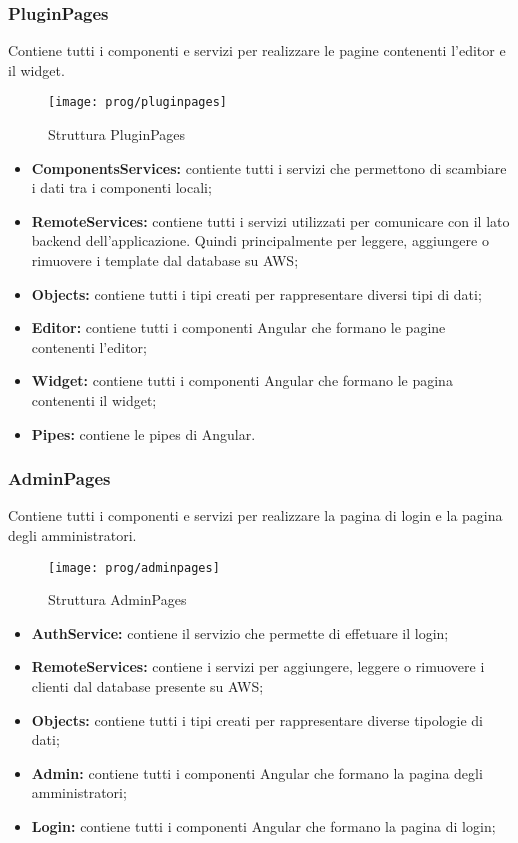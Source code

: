 \subsubsection{PluginPages}
Contiene tutti i componenti e servizi per realizzare le pagine contenenti l'editor e il widget.
\begin{figure}[!h] 
	\centering 
	\texttt{[image: prog/pluginpages]} 
	\caption{Struttura PluginPages}
\end{figure}
\begin{itemize}
	\item \textbf{ComponentsServices:} contiente tutti i servizi che permettono di scambiare i dati tra i componenti locali;
	\item \textbf{RemoteServices:} contiene tutti i servizi utilizzati per comunicare con il lato backend dell'applicazione. Quindi principalmente per leggere, aggiungere o rimuovere i template dal database su AWS;
	\item \textbf{Objects:} contiene tutti i tipi creati per rappresentare diversi tipi di dati;
	\item \textbf{Editor:} contiene tutti i componenti Angular che formano le pagine contenenti l'editor;
	\item \textbf{Widget:} contiene tutti i componenti Angular che formano le pagina contenenti il widget;
	\item \textbf{Pipes:} contiene le pipes di  Angular.
\end{itemize}
\newpage
\subsubsection{AdminPages}
Contiene tutti i componenti e servizi per realizzare la pagina di login e la pagina degli amministratori.
\begin{figure}[!h] 
	\centering 
	\texttt{[image: prog/adminpages]} 
	\caption{Struttura AdminPages}
\end{figure}
\begin{itemize}
	\item \textbf{AuthService:} contiene il servizio che permette di effetuare il login;
	\item \textbf{RemoteServices:} contiene i servizi per aggiungere, leggere o rimuovere i clienti dal database presente su AWS;
	\item \textbf{Objects:} contiene tutti i tipi creati per rappresentare diverse tipologie di dati;
	\item \textbf{Admin:} contiene tutti i componenti Angular che formano la pagina degli amministratori;
	\item \textbf{Login:} contiene tutti i componenti Angular che formano la pagina di login;
\end{itemize}
\newpage
